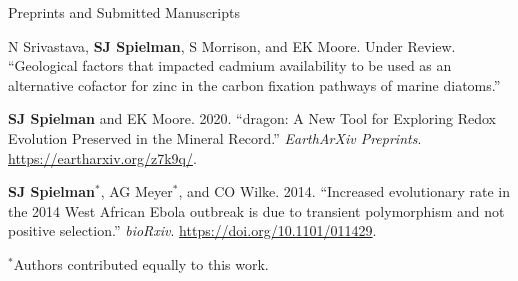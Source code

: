 \documentclass{resume} %
\begin{document}
\vspace*{0.35cm}
\begin{rSection}{Preprints and Submitted Manuscripts}
\vspace*{0.25cm}

\begin{etaremune}[leftmargin=1.5em]

\item N Srivastava, \textbf{SJ Spielman}, S Morrison, and EK Moore. Under Review. ``Geological factors that impacted cadmium availability to be used as an alternative cofactor for zinc in the carbon fixation pathways of marine diatoms.''

\item \textbf{SJ Spielman} and EK Moore. 2020. ``dragon: A New Tool for Exploring Redox Evolution Preserved in the Mineral Record.'' \emph{EarthArXiv Preprints}. \url{https://eartharxiv.org/z7k9q/}.

\item \textbf{SJ Spielman}$^\ast$, AG Meyer$^\ast$, and CO Wilke. 2014. ``Increased evolutionary rate in the 2014 West African Ebola outbreak is due to transient polymorphism and not positive selection.'' \emph{bioRxiv}. \url{https://doi.org/10.1101/011429}.

\end{etaremune}


$^\ast$Authors contributed equally to this work.
\end{rSection}



\end{document}

